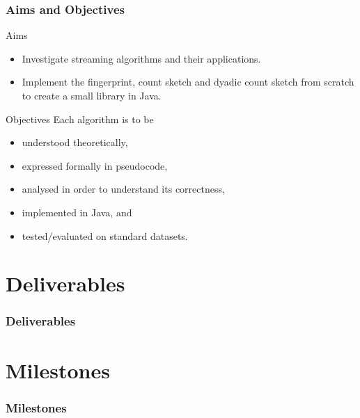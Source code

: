 \documentclass{beamer}
\begin{document}
\begin{frame}
  \frametitle{Aims and Objectives}

  \begin{block}{Aims}
    \begin{itemize}
      \item Investigate streaming algorithms and their applications.
      \item Implement the \alert{fingerprint}, \alert{count sketch} and \alert{dyadic count sketch} from scratch to create a small library in Java.
    \end{itemize}
  \end{block}

  \begin{block}{Objectives}
    Each algorithm is to be
    \begin{itemize}
      \item understood theoretically,
      \item expressed formally in pseudocode,
      \item analysed in order to understand its correctness,
      \item implemented in Java, and
      \item tested/evaluated on standard datasets.
    \end{itemize}
  \end{block}
\end{frame}

\section{Deliverables}

\begin{frame}
  \frametitle{Deliverables}

  \begin{center}
    \scalebox{0.5}{}
  \end{center}
\end{frame}

\section{Milestones}

\begin{frame}
  \frametitle{Milestones}

  \begin{center}
    
  \end{center}
\end{frame}
\end{document}
